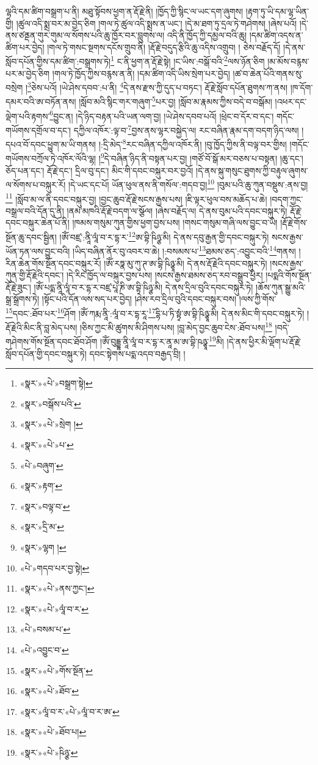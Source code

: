 ལྷའི་དམ་ཚིག་བསྒྲག་པ་ནི། མཐུ་སྟོབས་ཕྱག་ན་རྡོ་རྗེ་ནི། །ཁྱོད་ཀྱི་སྙིང་ལ་ཡང་དག་ཞུགས། །རྟག་ཏུ་ཡི་དམ་ལྷ་ཡིན་གྱི། །ཚུལ་འདི་སྨྲ་བར་མ་བྱེད་ཅིག །གལ་ཏེ་ཚུལ་འདི་སྨྲས་ན་ཡང་། །དེ་མ་ཐག་ཏུ་དྲལ་ཏེ་གཤེགས། །ཞེས་པའོ། །དེ་ནས་ཙནྡན་གུར་གུམ་ལ་སོགས་པའི་ཆུ་ཁྱོར་བར་བླུགས་ལ། འདི་ནི་ཁྱོད་ཀྱི་དམྱལ་བའི་ཆུ། །དམ་ཚིག་འདས་ན་ཚིག་པར་བྱེད། །གལ་ཏེ་གསང་སྔགས་དངོས་གྲུབ་ནི། །རྡོ་རྗེ་བདུད་རྩིའི་ཆུ་འདིས་འགྲུབ། །
ཅེས་བརྗོད་དོ། །དེ་ནས་སློབ་དཔོན་གྱིས་དམ་ཚིག་:བསྒྲགས་ཏེ།\footnote{«སྣར་»«པེ་»བསྒྲག་སྟེ།} ང་ནི་ཕྱག་ན་རྡོ་རྗེ་སྟེ། །ང་ཡིས་:བསྒོ་བའི་\footnote{«སྣར་»བསྒོས་པའི་}ལས་ཉོན་ཅིག །མ་མོས་བརྙས་པར་མ་བྱེད་ཅིག །གལ་ཏེ་ཁྱོད་ཀྱིས་བརྙས་ན་ནི། །དམ་ཚིག་འདི་ཡིས་སྲེག་པར་བྱེད། །ཚ་བ་ཆེན་པོའི་གནས་སུ་བསྲེག །\footnote{«སྣར་»«པེ་»སྲེག །}ཅེས་པའོ། །ཡེ་ཤེས་དབབ་:པ་ནི། \footnote{«སྣར་»«པེ་»པ་}དེ་ནས་རྫས་ཀྱི་དུད་པ་བཏང་། རྡོ་རྗེ་སློབ་དཔོན་ཐུགས་ཀ་ནས། །ཁ་དོག་དམར་བའི་ཨ་བཏོན་ནས། །སློབ་མའི་སྙིང་གར་གཞུག་\footnote{«པེ་»བཞུག་}པར་བྱ། །སློབ་མ་རྣམས་ཀྱིས་བདེ་བ་བསྒོམ། །འཕར་དང་ལྡེག་པའི་རྟགས་\footnote{«སྣར་»རྟག་}བྱུང་ན། །དེ་ཉིད་བརྟན་པའི་ཡན་ལག་བྱ། །ཡེ་ཤེས་དབབ་པའོ། །ཕྲེང་བ་དོར་བ་དང་། གདོང་གཡོགས་དགྲོལ་བ་དང་། དཀྱིལ་འཁོར་:ལྟ་བ་\footnote{«སྣར་»བལྟ་བ་}བྱས་ནས་ལྷར་བསྐྱེད་ལ། རང་བཞིན་རྣམ་དག་བདག་ཉིད་ལས། །དཔའ་བོ་དབང་ཕྱུག་མ་ཡི་གནས། །:དྲི་མེད་\footnote{«སྣར་»དྲི་མ་}རང་བཞིན་དཀྱིལ་འཁོར་ནི། །བུ་ཁྱོད་ཀྱིས་ནི་བལྟ་བར་གྱིས། །གདོང་གཡོགས་བཀྲོལ་ཏེ་འཁོར་ལོའི་ལྷ། །\footnote{«སྣར་»ལྷག །}དེ་བཞིན་ཉིད་ནི་བསྟན་པར་བྱ། །གཙོ་བོ་སྒོ་མར་བཅས་པ་བསྟན། །ཆུ་དང་། ཅོད་པན་དང་། རྡོ་རྗེ་དང་། དྲིལ་བུ་དང་། མིང་གི་དབང་བསྐུར་བར་བྱའོ། །དེ་ནས་སྐུ་གསུང་ཐུགས་ཀྱི་བརྟུལ་ཞུགས་ལ་སོགས་པ་བསྐུར་རོ། །དེ་ཡང་དང་པོ། ཡོན་ཕུལ་ནས་ནི་གསོལ་:གདབ་བྱ།\footnote{«པེ་»གདབ་པར་བྱ་སྟེ།} །བུམ་པའི་ཆུ་ཀུན་བསྡུས་:ནས་བྱ།\footnote{«སྣར་»«པེ་»ནས་ཀྱང་།} །སློབ་མ་ལ་ནི་དབང་བསྐུར་བྱ། །བྱང་ཆུབ་རྡོ་རྗེ་སངས་རྒྱས་པས། །ཇི་ལྟར་ཕུལ་བས་མཆོད་པ་ཆེ། །བདག་ཀྱང་བསྒྲལ་བའི་དོན་དུ་ནི། །ནམ་མཁའི་རྡོ་རྗེ་བདག་ལ་སྩོལ། །ཞེས་བརྗོད་ལ། དེ་ནས་བུམ་པའི་དབང་བསྐུར་ཏེ། རྡོ་རྗེ་དབང་བསྐུར་ཆེན་པོ་ནི། །ཁམས་གསུམ་ཀུན་གྱིས་ཕྱག་བྱས་པས། །གསང་གསུམ་གཞི་ལས་བྱུང་བ་ཡི། །རྡོ་རྗེ་གོས་སྔོན་ཆུ་དབང་སྦྱིན། །ཨོཾ་བཛྲ་:ནཱི་ལཱཾ་བ་ར་དྷ་ར་\footnote{«སྣར་»«པེ་»ལཱཾ་བ་ར་}ཨ་བྷི་ཥིཉྩ་མི། དེ་ནས་དབུ་རྒྱན་གྱི་དབང་བསྐུར་ཏེ། སངས་རྒྱས་ཡོན་ཏན་ལས་བྱུང་བའི། །ཡིད་བཞིན་ནོར་བུ་འབར་བ་ཆེ། །:བསམས་པ་\footnote{«པེ་»བསམ་པ་}ཐམས་ཅད་:འབྱུང་བའི་\footnote{«པེ་»འབྱུང་བ་}གནས། །རིན་ཆེན་གོས་སྔོན་དབང་བསྐུར་རོ། །ཨོཾ་རཏྣ་མུ་ཀུ་ཊ་ཨ་བྷི་ཥིཉྩཱ་མི། དེ་ནས་རྡོ་རྗེའི་དབང་བསྐུར་ཏེ། །སངས་རྒྱས་ཀུན་གྱི་རྡོ་རྗེའི་དབང་། །དེ་རིང་ཁྱོད་ལ་བསྐུར་བྱས་པས། །སངས་རྒྱས་ཐམས་ཅད་རབ་བསྒྲུབ་ཕྱིར། །པདྨའི་གོས་སྔོན་རྡོ་རྗེ་ཟུང་། །ཨོཾ་པདྨ་ནཱི་ལཱཾ་བ་ར་དྷ་ར་བཛྲ་པཱ་ཎི་ཨ་བྷི་ཥིཉྩ་མི། དེ་ནས་དྲིལ་བུའི་དབང་བསྐུར་ཏེ། །ཆོས་ཀུན་སྒྱུ་མའི་སྒྲ་སྒྲོགས་ཏེ། །སྟོང་པའི་དོན་ལས་སད་པར་བྱེད། །ཤེས་རབ་དྲིལ་བུའི་དབང་བསྐུར་བས། །ལས་ཀྱི་གོས་\footnote{«སྣར་»«པེ་»གོས་སྔོན་}དབང་:ཐོབ་པར་\footnote{«སྣར་»«པེ་»ཐོབ་}ཤོག །ཨོཾ་ཀརྨ་ནཱི་:ལཱཾ་བ་ར་དྷ་རཱ་\footnote{«སྣར་»ལཱཾ་བ་ར་«པེ་»ལཱཾ་བ་ར་ཨ་}དྷི་པ་ཏི་སྟྭཾ་ཨ་བྷི་ཥིཉྩཱ་མི། དེ་ནས་མིང་གི་དབང་བསྐུར་ཏེ། །རྡོ་རྗེའི་མིང་ནི་བླ་མེད་པས། །ཅིས་ཀྱང་མི་ཚུགས་མི་ཤིགས་པས། །བླ་མེད་བྱང་ཆུབ་ངེས་:ཐོབ་པས།\footnote{«སྣར་»«པེ་»ཐོབ་པ།} །བདེ་གཤེགས་གོས་སྔོན་དབང་ཐོབ་ཤོག །ཨོཾ་བུདྡྷ་ནཱི་ལཱཾ་བ་ར་དྷ་ར་ནཱ་མ་ཨ་བྷི་ཥཉྩཱ་\footnote{«སྣར་»«པེ་»ཥིཉྩ་}མི། །དེ་ནས་ཕྱིར་མི་ལྡོག་པ་རྡོ་རྗེ་སློབ་དཔོན་གྱི་དབང་བསྐུར་ཏེ། དབང་སྟེགས་པདྨ་འདབ་བརྒྱད་བྲི། །
